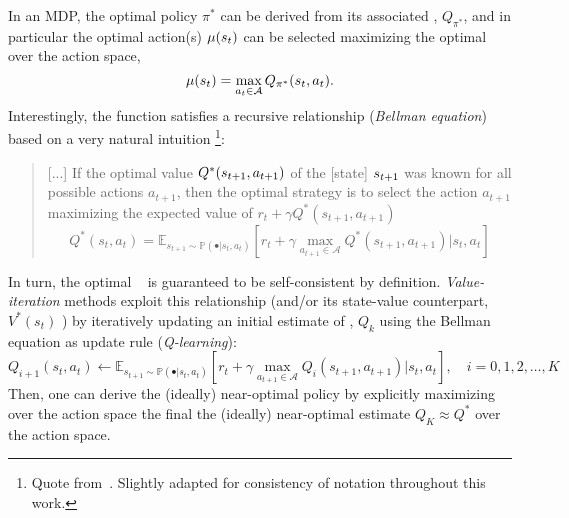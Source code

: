 In an MDP, the optimal policy \( \pi^* \) can be derived from its associated \qfunction, \( Q_{\pi^*} \), and in particular the optimal action(s) \(\mu(s_t)\) can be selected maximizing the optimal \qfunction over the action space,
\[
\mu(s_t) = \max_{a_t \in \mathcal A} Q_{\pi^*}(s_t, a_t).
\]
Interestingly, the \qopt function satisfies a recursive relationship (\emph{Bellman equation}) based on a very natural intuition%
\footnote{Quote from~\citet{mnihPlayingAtariDeep2013}. Slightly adapted for consistency of notation throughout this work.}:
\begin{quote}
    [...] If the optimal value \( Q^*(s_{t+1}, a_{t+1}) \) of the [state] \(s_{t+1} \) was known for all possible actions \(a_{t+1} \), then the optimal strategy is to select the action \( a_{t+1}\) maximizing the expected value of \( r_t + \gamma Q^*(s_{t+1}, a_{t+1}) \)
\[ 
Q^*(s_t, a_t) = \mathbb E_{s_{t+1} \sim \mathbb P(\bullet \vert s_t, a_t)} \left[ r_t + \gamma \max_{a_{t+1} \in \mathcal A} Q^*(s_{t+1}, a_{t+1}) \big\vert s_t, a_t  \right]
\]
\end{quote}

In turn, the optimal \qfunction \ %
is guaranteed to be self-consistent by definition.
\emph{Value-iteration} methods exploit this relationship (and/or its state-value counterpart, \( V^*(s_t) \) ) by iteratively updating an initial estimate of \qopt, \( Q_k \) using the Bellman equation as update rule (\emph{Q-learning}):
\[
    Q_{i+1}(s_t, a_t) \leftarrow \mathbb E_{s_{t+1} \sim \mathbb P(\bullet \vert s_t, a_t)} \left[ r_t + \gamma \max_{a_{t+1} \in \mathcal A} Q_i (s_{t+1}, a_{t+1}) \big\vert s_t, a_t  \right],  \quad i=0,1,2,\dots,K
\]
Then, one can derive the (ideally) near-optimal policy by explicitly maximizing over the action space the final the (ideally) near-optimal estimate \( Q_K \approx Q^* \) over the action space.

